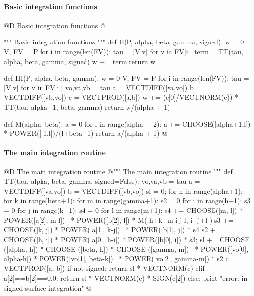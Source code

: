 \documentclass[11pt,oneside]{article}	%
\begin{document}
\paragraph{Basic integration functions}
@D Basic integration functions
@{""" Basic integration functions """
def II(P, alpha, beta, gamma, signed):
    w = 0
    V, FV = P
    for i in range(len(FV)):
        tau = [V[v] for v in FV[i]]
        term = TT(tau, alpha, beta, gamma, signed)
        w += term
    return w

def III(P, alpha, beta, gamma):
    w = 0
    V, FV = P
    for i in range(len(FV)):
        tau = [V[v] for v in FV[i]]
        vo,va,vb = tau
        a = VECTDIFF([va,vo])
        b = VECTDIFF([vb,vo])
        c = VECTPROD([a,b])
        w += (c[0]/VECTNORM(c)) * TT(tau, alpha+1, beta, gamma)
    return w/(alpha + 1)

def M(alpha, beta):
    a = 0
    for l in range(alpha + 2):
        a += CHOOSE([alpha+1,l]) * POWER([-1,l])/(l+beta+1)
    return a/(alpha + 1)
@}



\paragraph{The main integration routine}
@D The main integration routine
@{""" The main integration routine """
def TT(tau, alpha, beta, gamma, signed=False):
	vo,va,vb = tau
	a = VECTDIFF([va,vo])
	b = VECTDIFF([vb,vo])
	sl = 0;
	for h in range(alpha+1):
		for k in range(beta+1):
			for m in range(gamma+1):
				s2 = 0
				for i in range(h+1): 
					s3 = 0
					for j in range(k+1):
						s4 = 0
						for l in range(m+1):
							s4 += CHOOSE([m, l]) * POWER([a[2], m-l]) \
								* POWER([b[2], l]) * M( h+k+m-i-j-l, i+j+l )
						s3 += CHOOSE([k, j]) * POWER([a[1], k-j]) \
							* POWER([b[1], j]) * s4
					s2 += CHOOSE([h, i]) * POWER([a[0], h-i]) * POWER([b[0], i]) * s3;
				sl += CHOOSE ([alpha, h]) * CHOOSE ([beta, k]) * CHOOSE ([gamma, m]) \
					* POWER([vo[0], alpha-h]) * POWER([vo[1], beta-k]) \
					* POWER([vo[2], gamma-m]) * s2
	c = VECTPROD([a, b])
	if not signed: return sl * VECTNORM(c)
	elif a[2]==b[2]==0.0: return sl * VECTNORM(c) * SIGN(c[2])
	else: print "error: in signed surface integration"
@}
\end{document}
